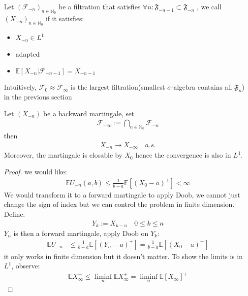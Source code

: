 \begin{definition}
	Let $(\mathcal{F}_{-n})_{n \in \mathbb{N}_0}$ be a filtration that satisfies $\forall n: \mathfrak{F}_{-n-1} \subset \mathfrak{F}_{-n}$ , we call $(X_{-n})_{n \in \mathbb{N}_0}$ if it satisfies:
	\begin{itemize}
		\item $X_{-n} \in L^1$
		\item adapted
		\item $\mathbb{E}[X_{-n} | \mathcal{F}_{-n -1}] = X_{-n-1}$
	\end{itemize}
	Intuitively, $\mathcal{F}_0 \approx \mathcal{F}_{\infty}$ is the largest filtration(smallest $\sigma$-algebra contains all $\mathfrak{F}_n$) in the previous section
\end{definition}

\begin{theorem}
	Let $(X_{-n})$ be a backward martingale, set\label{Q:why a filtration } 
	\begin{align*}
		\mathcal{F}_{-\infty} := \bigcap_{n \in \mathbb{N}_0} \mathcal{F}_{-n}
	\end{align*}
	then 
	\begin{align*}
		X_{-n} \rightarrow X_{-\infty} \quad a.s.
	\end{align*}
	Moreover, the martingale is closable by $X_0$ hence the convergence is also in $L^1$.
\end{theorem}
\begin{proof}
we would like:
\begin{align*}
	\mathbb{E}U_{-n}(a, b) \leq \frac{1}{b-a} \mathbb{E}[(X_0-a)^+] < \infty
\end{align*}	
We would transform it to a forward martingale to apply Doob, we cannot just change the sign of index but we can control the problem in finite dimension.
Define:
\begin{align*}
	Y_k:= X_{k-n} \quad 0 \le k \le n
\end{align*}
$Y_n$ is then a forward martingale, apply Doob on $Y_k$:
\begin{align*}
	\mathbb{E}U_{-n} &\le \frac{1}{b-a} \mathbb{E}[(Y_n - a)^+]
	= \frac{1}{b-a} \mathbb{E}[(X_0 - a)^+]
\end{align*}
it only works in finite dimension but it doesn't matter. To show the limits is in $L^1$, observe:
\begin{align*}
	\mathbb{E}X_\infty^+ \le \liminf_n \mathbb{E}X_\infty^+ 
	= \liminf_n \mathbb{E}[X_\infty]^+
\end{align*}
\end{proof}

